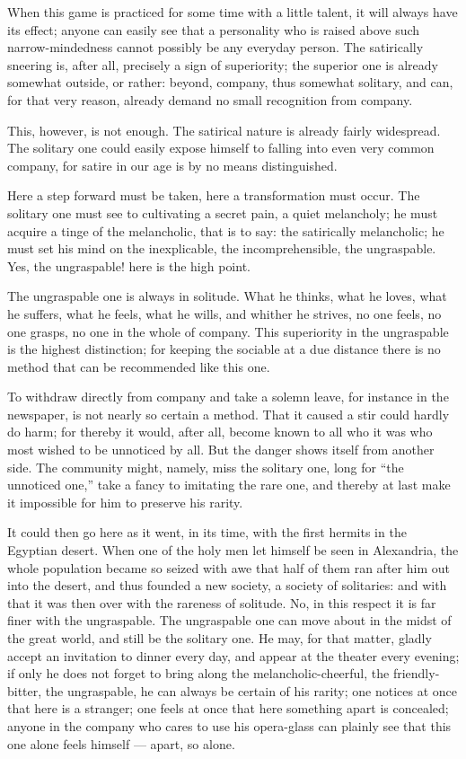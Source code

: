 \documentclass[12pt,a4paper]{book}
\begin{document}
When this game is practiced for some time with a little talent, it will always have its effect; anyone can easily see that a personality who is raised above such narrow-mindedness cannot possibly be any everyday person. The satirically sneering is, after all, precisely a sign of superiority; the superior one is already somewhat outside, or rather: beyond, company,
thus somewhat solitary, and can, for that very reason, already demand no small recognition from company.

This, however, is not enough. The satirical nature is already fairly widespread. The solitary one could easily expose himself to falling into even very common company, for satire in our age is by no means distinguished.

Here a step forward must be taken, here a transformation must occur. The solitary one must see to cultivating a secret pain, a quiet melancholy; he must acquire a tinge of the melancholic, that is to say: the satirically melancholic; he must set his mind on the inexplicable, the incomprehensible, the ungraspable. Yes, the ungraspable! here is the high point.

The ungraspable one is always in solitude. What he thinks, what he loves, what he suffers, what he feels, what he wills, and whither he strives, no one feels, no one grasps, no one in the whole of company. This superiority in the ungraspable is the highest distinction; for keeping the sociable at a due distance there is no method that can be recommended like this one.

To withdraw directly from company and take a solemn leave, for instance in the newspaper, is not nearly so certain a method. That it caused a stir could hardly do harm; for thereby it would, after all, become known to all who it was who most wished to be unnoticed by all. But the danger shows itself from another side. The community might, namely, miss the solitary one, long for ``the unnoticed one,'' take a fancy to imitating the rare one, and thereby at last make it impossible for him to preserve his rarity.

It could then go here as it went, in its time, with the first hermits in the Egyptian desert. When one of the holy men let himself be seen in Alexandria, the whole population became so seized with awe that half of them ran after him out into the desert, and thus founded a new society, a society of solitaries: and with that it was then over with the rareness of solitude.
No, in this respect it is far finer with the ungraspable. The ungraspable one can move about in the midst of the great world, and still be the solitary one. He may, for that matter, gladly accept an invitation to dinner every day, and appear at the theater every evening; if only he does not forget to bring along the melancholic-cheerful, the friendly-bitter, the ungraspable, he can always be certain of his rarity; one notices at once that here is a stranger; one feels at once that here something apart is concealed; anyone in the company who cares to use his opera-glass can plainly see that this one alone feels himself --- apart, so alone.
\end{document}
